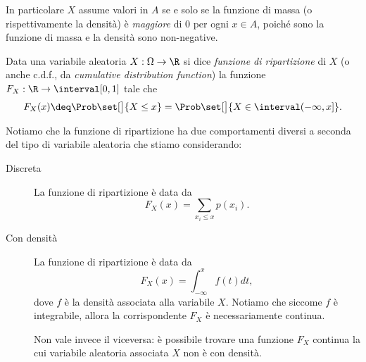 In particolare $X$ assume valori in $A$ se e solo se la funzione di massa (o rispettivamente la densità) è \emph{maggiore} di $0$ per ogni $x \in A$, poiché sono la funzione di massa e la densità sono non-negative.

\begin{definition}
    Data una variabile aleatoria $X : \Omega \to \R$ si dice \emph{funzione di ripartizione} di $X$ (o anche c.d.f., da \emph{cumulative distribution function}) la funzione $F_{X} : \R \to \interval[{0,1}]$ tale che \[
        F_{X}(x) \deq \Prob\set[\big]{X \leq x} = \Prob\set[\big]{X \in \interval({-\infty, x}]}.   
    \]
\end{definition}

Notiamo che la funzione di ripartizione ha due comportamenti diversi a seconda del tipo di variabile aleatoria che stiamo considerando: \begin{description}
    \item[Discreta] La funzione di ripartizione è data da \[
        F_X(x) = \sum_{x_i \leq x} p(x_i).    
    \]
    \item[Con densità] La funzione di ripartizione è data da \[
        F_X(x) = \int_{-\infty}^x f(t)dt,   
    \] dove $f$ è la densità associata alla variabile $X$.
    Notiamo che siccome $f$ è integrabile, allora la corrispondente $F_X$ è necessariamente continua.

    Non vale invece il viceversa: è possibile trovare una funzione $F_X$ continua la cui variabile aleatoria associata $X$ non è con densità.
\end{description}

